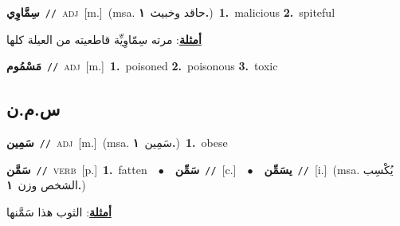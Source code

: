 \documentclass[10pt,a4paper,twoside]{article} %
\begin{document}
\begin{multicols}{2}
{\setlength\topsep{0pt}\textbf{\foreignlanguage{arabic}{سِمَّاوِي}}\ {\color{gray}\texttt{//}\color{black}}\ \textsc{adj}\ [m.]\ \color{gray}(msa. \foreignlanguage{arabic}{حاقد وخبيث}~\foreignlanguage{arabic}{\textbf{١.}})\color{black}\ \textbf{1.}~malicious  \textbf{2.}~spiteful\  \begin{flushright}\color{gray}\foreignlanguage{arabic}{\textbf{\underline{\foreignlanguage{arabic}{أمثلة}}}: مرته سِمّاوِيِّة قاطعيته من العيلة كلها}\end{flushright}\color{black}} \vspace{2mm}

{\setlength\topsep{0pt}\textbf{\foreignlanguage{arabic}{مَسْمُوم}}\ {\color{gray}\texttt{//}\color{black}}\ \textsc{adj}\ [m.]\ \textbf{1.}~poisoned  \textbf{2.}~poisonous  \textbf{3.}~toxic\ } \vspace{2mm}

\vspace{-3mm}
\subsection*{\color{blue}\foreignlanguage{arabic}{س.م.ن}\color{blue}{}} 

{\setlength\topsep{0pt}\textbf{\foreignlanguage{arabic}{سَمِين}}\ {\color{gray}\texttt{//}\color{black}}\ \textsc{adj}\ [m.]\ \color{gray}(msa. \foreignlanguage{arabic}{سَمِين}~\foreignlanguage{arabic}{\textbf{١.}})\color{black}\ \textbf{1.}~obese\ } \vspace{2mm}

{\setlength\topsep{0pt}\textbf{\foreignlanguage{arabic}{سَمَّن}}\ {\color{gray}\texttt{//}\color{black}}\ \textsc{verb}\ [p.]\ \textbf{1.}~fatten\ \ $\bullet$\ \ \setlength\topsep{0pt}\textbf{\foreignlanguage{arabic}{سَمِّن}}\ {\color{gray}\texttt{//}\color{black}}\ [c.]\ \ $\bullet$\ \ \setlength\topsep{0pt}\textbf{\foreignlanguage{arabic}{يسَمِّن}}\ {\color{gray}\texttt{//}\color{black}}\ [i.]\ \color{gray}(msa. \foreignlanguage{arabic}{يُكْسِب الشخص وزن}~\foreignlanguage{arabic}{\textbf{١.}})\color{black}\  \begin{flushright}\color{gray}\foreignlanguage{arabic}{\textbf{\underline{\foreignlanguage{arabic}{أمثلة}}}: الثوب هذا سَمَّنها}\end{flushright}\color{black}} \vspace{2mm}


\end{multicols}
\end{document}
